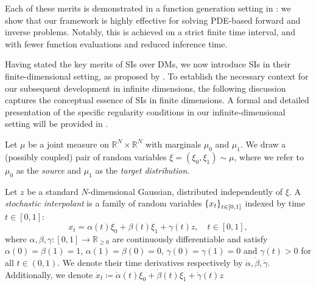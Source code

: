 Each of these merits is demonstrated in a function generation setting in : we show that our framework is highly effective for solving PDE-based forward and inverse problems. Notably, this is achieved on a strict finite time interval, and with fewer function evaluations and reduced inference time.

Having stated the key merits of SIs over DMs, we now introduce SIs in their finite-dimensional setting, as proposed by \citet{albergo2023stochasticinterpolantsunifyingframework,albergo2023stochastic}. To establish the necessary context for our subsequent development in infinite dimensions, the following discussion captures the conceptual essence of SIs in finite dimensions. A formal and detailed presentation of the specific regularity conditions in our infinite-dimensional setting will be provided in .

Let \(\mu\) be a joint measure on \(\mathbb{R}^{N} \times \mathbb{R}^{N}\) with marginals \(\mu_{0}\) and \(\mu_{1}\). We draw a (possibly coupled) pair of random variables \(\xi = (\xi_{0}, \xi_{1}) \sim \mu\), where we refer to \(\mu_{0}\) as the \textit{source} and \(\mu_{1}\) as the \textit{target distribution}.



Let \(z\) be a standard \(N\)-dimensional Gaussian, distributed independently of \(\xi\). A \textit{stochastic interpolant} is a family of random variables \(\qty{x_{t}}_{t \in [0, 1]}\) indexed by time \(t \in [0, 1]\):
\[
  x_{t} = \alpha(t) \xi_{0} + \beta(t) \xi_{1} + \gamma(t)z, \quad t \in [0, 1],
\]
where \(\alpha, \beta, \gamma : [0, 1] \to \mathbb{R}_{\geq 0}\) are continuously differentiable and satisfy \(\alpha(0) =  \beta(1) = 1\), \(\alpha(1) = \beta(0) = 0\), \(\gamma(0) = \gamma(1) = 0\) and \(\gamma(t) > 0\) for all \(t \in (0, 1)\). We denote their time derivatives respectively by \(\dot{\alpha}, \dot{\beta}, \dot{\gamma}\). Additionally, we denote \(\dot{x}_{t} \coloneqq \dot{\alpha}(t)\xi_{0} + \dot{\beta}(t) \xi_{1} + \dot{\gamma}(t) z\)

